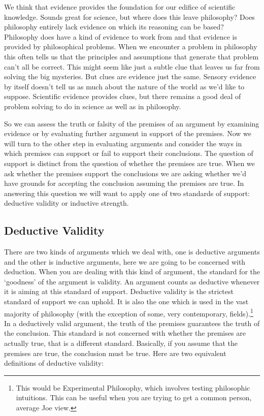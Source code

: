 We think that evidence provides the foundation for our edifice of scientific knowledge. Sounds great for science, but where does this leave philosophy? Does philosophy entirely lack evidence on which its reasoning can be based? Philosophy does have a kind of evidence to work from and that evidence is provided by philosophical problems. When we encounter a problem in philosophy this often tells us that the principles and assumptions that generate that problem can’t all be correct. This might seem like just a subtle clue that leaves us far from solving the big mysteries. But clues are evidence just the same. Sensory evidence by itself doesn’t tell us as much about the nature of the world as we’d like to suppose. Scientific evidence provides clues, but there remains a good deal of problem solving to do in science as well as in philosophy.

So we can assess the truth or falsity of the premises of an argument by examining evidence or by evaluating further argument in support of the premises. Now we will turn to the other step in evaluating arguments and consider the ways in which premises can support or fail to support their conclusions. The question of support is distinct from the question of whether the premises are true. When we ask whether the premises support the conclusions we are asking whether we’d have grounds for accepting the conclusion assuming the premises are true. In answering this question we will want to apply one of two standards of support: deductive validity or inductive strength.

\subsection{Deductive Validity}
\label{s:p1.2.1}
There are two kinds of arguments which we deal with, one is \glspl{deductive argument} and the other is inductive arguments, here we are going to be concerned with deduction. When you are dealing with this kind of argument, the standard for the `goodness' of the argument is validity. An argument counts as deductive whenever it is aiming at this standard of support. Deductive validity is the strictest standard of support we can uphold. It is also the one which is used in the vast majority of philosophy (with the exception of some, very contemporary, fields).\footnote{This would be Experimental Philosophy, which involves testing philosophic intuitions. This can be useful when you are trying to get a common person, average Joe view.} In a deductively \gls{valid} argument, the truth of the premises guarantees the truth of the conclusion. This standard is not concerned with whether the premises are actually true, that is a different standard. Basically, if you assume that the premises are true, the conclusion must be true. Here are two equivalent definitions of deductive validity:

